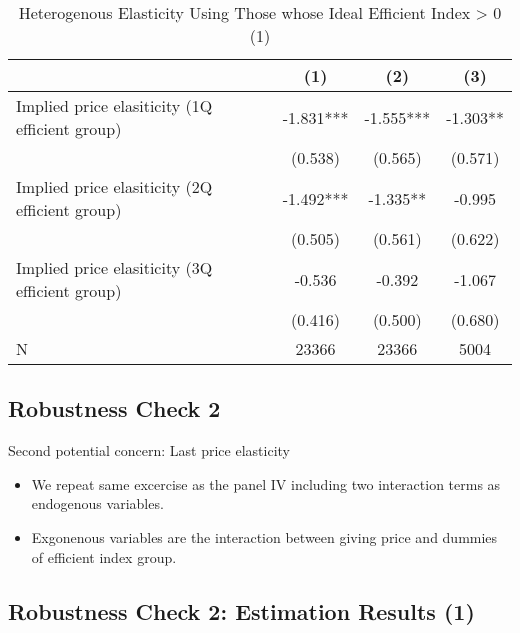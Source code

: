 \documentclass[ review  , 3p ]{elsarticle}
\providecommand{\tightlist}{%
  \setlength{\itemsep}{0pt}\setlength{\parskip}{0pt}}
\begin{document}
  \begin{table}

  \caption{\label{tab:kableSubsetHeteroElasticitySlide2}Heterogenous Elasticity Using Those whose Ideal Efficient Index > 0 (1)}
  \centering
  \fontsize{8}{10}\selectfont
  \begin{tabular}[t]{lccc}
  \toprule
   & (1) & (2) & (3)\\
  \midrule
  Implied price elasiticity (1Q efficient group) & -1.831*** & -1.555*** & -1.303**\\
   & (0.538) & (0.565) & (0.571)\\
  Implied price elasiticity (2Q efficient group) & -1.492*** & -1.335** & -0.995\\
   & (0.505) & (0.561) & (0.622)\\
  Implied price elasiticity (3Q efficient group) & -0.536 & -0.392 & -1.067\\
   & (0.416) & (0.500) & (0.680)\\
  N & 23366 & 23366 & 5004\\
  \bottomrule
  \end{tabular}
  \end{table}

  \hypertarget{robustness-check-2}{%
  \subsection{Robustness Check 2}\label{robustness-check-2}}

  Second potential concern: Last price elasticity

  \begin{itemize}
  \tightlist
  \item
    We repeat same excercise as the panel IV including two interaction terms as endogenous variables.
  \item
    Exgonenous variables are the interaction between giving price and dummies of efficient index group.
  \end{itemize}

  \hypertarget{robustness-check-2-estimation-results-1}{%
  \subsection{Robustness Check 2: Estimation Results (1)}\label{robustness-check-2-estimation-results-1}}
\end{document}
